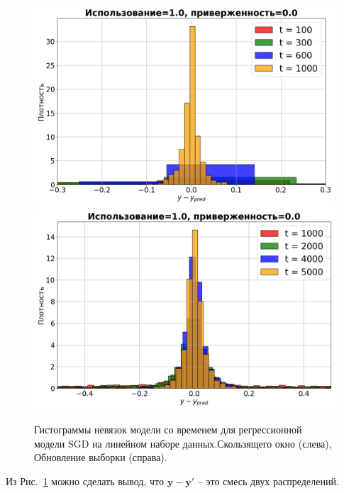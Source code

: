     \begin{figure}[ht]
        \centering
        \includegraphics[width=0.49\linewidth]{pictures/hist_sw_synthetic_sgd_model_50_1.0_0.0.png}
        \includegraphics[width=0.49\linewidth]{pictures/hist_su_synthetic_sgd_model_50_1.0_0.0.png}
        
        \caption{Гистограммы невязок модели со временем для регрессионной модели SGD на линейном наборе данных.Скользящего окно (слева), Обновление выборки (справа).}
        \label{hist}
    \end{figure}

    Из Рис.~\ref{hist} можно сделать вывод, что $\mathbf{y} - \mathbf{y'}$ -- это смесь двух распределений.

